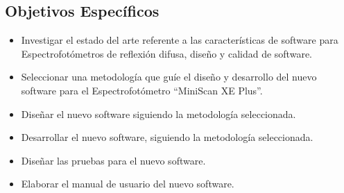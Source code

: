 		\subsection{Objetivos Espec\'{i}ficos}
			\begin{itemize}
				\item Investigar el estado del arte referente a las caracter\'{i}sticas de software para Espectrofot\'{o}metros de reflexi\'{o}n difusa, dise\~{n}o y calidad de software.
				\item Seleccionar una metodolog\'{i}a que gu\'{i}e el dise\~{n}o y desarrollo del nuevo software para el Espectrofot\'{o}metro ``MiniScan XE Plus''.
				\item Dise\~{n}ar el nuevo software siguiendo la metodolog\'{i}a seleccionada.
				\item Desarrollar el nuevo software, siguiendo la metodolog\'{i}a seleccionada.
				\item Dise\~{n}ar las pruebas para el nuevo software.
				\item Elaborar el manual de usuario del nuevo software.
			\end{itemize}